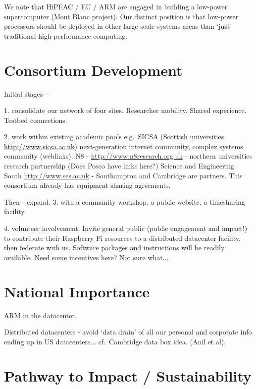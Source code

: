 \documentclass[a4paper,11pt]{article}
\begin{document}
We note that HiPEAC / EU / ARM are engaged in building a low-power supercomputer (Mont Blanc project). Our distinct position is that low-power processors should be deployed in other large-scale systems areas than `just' traditional high-performance computing.



\section{Consortium Development}


Initial stages---

1. consolidate our network of four sites. Researcher mobility. Shared experience. Testbed connections.

2. 
work within existing academic pools e.g.\ SICSA (Scottish universities \url{http://www.sicsa.ac.uk}) next-generation internet community, complex systems community (weblinks).
N8 - \url{http://www.n8research.org.uk} - northern universities research partnership (Does Posco have links here?)
Science and Engineering South \url{http://www.ses.ac.uk} - Southampton and Cambridge are partners. This consortium already has equipment sharing agreements.

Then - expand.
3. with a community workshop, a public website, a timesharing facility.

4. volunteer involvement. Invite general public (public engagement and impact!) to contribute their Raspberry Pi resources to a distributed datacenter facility, then federate with us. Software packages and instructions will be readily available. Need some incentives here? Not sure what...



\section{National Importance}


ARM in the datacenter.

Distributed datacenters - avoid `data drain' of all our personal and corporate info ending up in US datacenters... cf.\ Cambridge data box idea. (Anil et al).


\section{Pathway to Impact / Sustainability}
\end{document}
